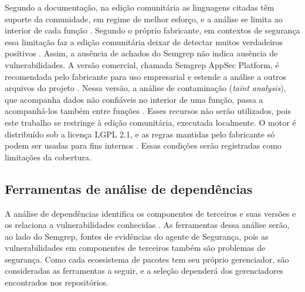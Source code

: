 Segundo a documentação, na edição comunitária as linguagens citadas têm suporte da comunidade, em regime de melhor esforço, e a análise se limita ao interior de cada função \cite{semgrepDocs}. Segundo o próprio fabricante, em contextos de segurança essa limitação faz a edição comunitária deixar de detectar muitos verdadeiros positivos \cite{semgrepReadme}. Assim, a ausência de achados do Semgrep não indica ausência de vulnerabilidades. A versão comercial, chamada Semgrep AppSec Platform, é recomendada pelo fabricante para uso empresarial e estende a análise a outros arquivos do projeto \cite{semgrepIntro}. Nessa versão, a análise de contaminação (\textit{taint analysis}), que acompanha dados não confiáveis no interior de uma função, passa a acompanhá-los também entre funções \cite{semgrepTaint}. Esses recursos não serão utilizados, pois este trabalho se restringe à edição comunitária, executada localmente. O motor é distribuído sob a licença LGPL 2.1, e as regras mantidas pelo fabricante só podem ser usadas para fins internos \cite{semgrepLicensing}. Essas condições serão registradas como limitações da cobertura.

\subsection{Ferramentas de análise de dependências}
\label{st-dependencias}

A análise de dependências identifica os componentes de terceiros e suas versões e os relaciona a vulnerabilidades conhecidas \cite{blackIr8397}. As ferramentas dessa análise serão, ao lado do Semgrep, fontes de evidências do agente de Segurança, pois as vulnerabilidades em componentes de terceiros também são problemas de segurança. Como cada ecossistema de pacotes tem seu próprio gerenciador, são consideradas as ferramentas a seguir, e a seleção dependerá dos gerenciadores encontrados nos repositórios.

